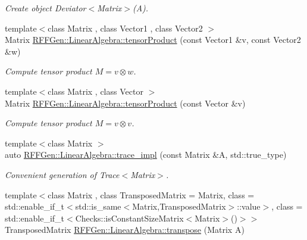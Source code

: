 \begin{DoxyCompactItemize}
\begin{DoxyCompactList}\small\item\em Create object Deviator$<$\-Matrix$>$(\-A). \end{DoxyCompactList}\item 
\hypertarget{group__LinearAlgebraGroup_gaa8e93771d2ca8b05ab77449c2b3f9b38}{{\footnotesize template$<$class Matrix , class Vector1 , class Vector2 $>$ }\\Matrix \hyperlink{group__LinearAlgebraGroup_gaa8e93771d2ca8b05ab77449c2b3f9b38}{R\-F\-F\-Gen\-::\-Linear\-Algebra\-::tensor\-Product} (const Vector1 \&v, const Vector2 \&w)}\label{group__LinearAlgebraGroup_gaa8e93771d2ca8b05ab77449c2b3f9b38}

\begin{DoxyCompactList}\small\item\em Compute tensor product $ M = v \otimes w $. \end{DoxyCompactList}\item 
\hypertarget{group__LinearAlgebraGroup_gac2461ba581a9fd80f9c622c5a15c3bfc}{{\footnotesize template$<$class Matrix , class Vector $>$ }\\Matrix \hyperlink{group__LinearAlgebraGroup_gac2461ba581a9fd80f9c622c5a15c3bfc}{R\-F\-F\-Gen\-::\-Linear\-Algebra\-::tensor\-Product} (const Vector \&v)}\label{group__LinearAlgebraGroup_gac2461ba581a9fd80f9c622c5a15c3bfc}

\begin{DoxyCompactList}\small\item\em Compute tensor product $ M = v \otimes v $. \end{DoxyCompactList}\item 
{\footnotesize template$<$class Matrix $>$ }\\auto \hyperlink{group__LinearAlgebraGroup_ga4ec03eed0b64879de5c8c519e29f180e}{R\-F\-F\-Gen\-::\-Linear\-Algebra\-::trace\-\_\-impl} (const Matrix \&A, std\-::true\-\_\-type)
\begin{DoxyCompactList}\small\item\em Convenient generation of Trace$<$\-Matrix$>$. \end{DoxyCompactList}\item 
\hypertarget{group__LinearAlgebraGroup_ga547f56fe3fddb39aad3e80e94866a98b}{{\footnotesize template$<$class Matrix , class Transposed\-Matrix  = Matrix, class  = std\-::enable\-\_\-if\-\_\-t$<$std\-::is\-\_\-same$<$\-Matrix,\-Transposed\-Matrix$>$\-::value$>$, class  = std\-::enable\-\_\-if\-\_\-t$<$\-Checks\-::is\-Constant\-Size\-Matrix$<$\-Matrix$>$()$>$$>$ }\\Transposed\-Matrix \hyperlink{group__LinearAlgebraGroup_ga547f56fe3fddb39aad3e80e94866a98b}{R\-F\-F\-Gen\-::\-Linear\-Algebra\-::transpose} (Matrix A)}\label{group__LinearAlgebraGroup_ga547f56fe3fddb39aad3e80e94866a98b}


\end{DoxyCompactItemize}
